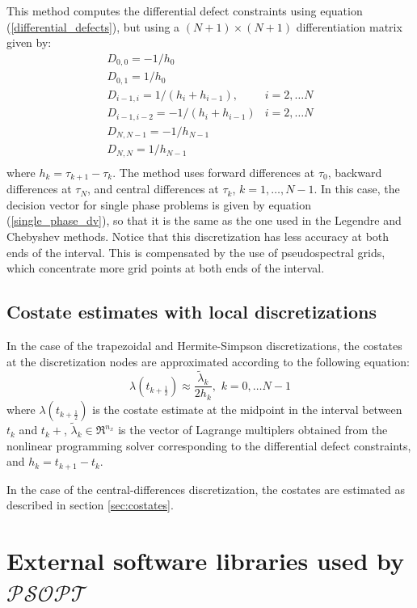 \documentclass[a4paper,11pt]{report}    %
\newcommand{\psopt}{$\mathcal{PSOPT}$\,}  %
\begin{document}
This method computes the differential defect constraints using equation (\ref{differential_defects}), but
using a $(N+1) \times (N+1)$ differentiation matrix given by:
\[
\begin{array}{ll}
 D_{0,0}   =  -1/h_{0} \\
 D_{0,1}   =   1/h_{0} \\
 D_{i-1,i} =  1/(h_{i}+h_{i-1}),  & i=2,\ldots N \\
 D_{i-1,i-2} =  -1/(h_{i}+h_{i-1})  & i=2, \ldots N \\
 D_{N,N-1} =  -1/h_{N-1} \\
 D_{N,N} = 1/h_{N-1} \\
\end{array}
\]
where $h_k = \tau_{k+1} - \tau_{k}$.  The method uses forward differences at $\tau_0$, 
backward differences at $\tau_N$, and central differences at $\tau_k$, $k=1,\ldots, N-1$.
In this case, the decision vector for single
phase problems is given by equation (\ref{single_phase_dv}), so that it is the same as the one
used in the Legendre and Chebyshev methods. Notice that this discretization has less accuracy at
both ends of the interval. This is compensated by the use of pseudospectral grids, which concentrate
more grid points at both ends of the interval.


\subsection{Costate estimates with local discretizations}

In the case of the trapezoidal and Hermite-Simpson discretizations, the costates at the discretization nodes are approximated 
according to the following equation:
\[
    \lambda(t_{k+\frac{1}{2}})  \approx \frac{ \tilde \lambda_k }{2 h_k }, \, \, k=0,\ldots N-1
\]
where   $\lambda(t_{k+\frac{1}{2}})$ is the costate estimate at the midpoint in the interval between $t_k$ and $t_k+$, 
$\tilde \lambda_k \in \Re^{n_x}$ is the vector of Lagrange multiplers obtained from the nonlinear programming solver corresponding
to the differential defect constraints, and $h_k=t_{k+1}-t_{k}$.

In the case of the central-differences discretization, the costates are estimated as described in section \ref{sec:costates}.

\section{External software libraries used by \psopt}
\end{document}
